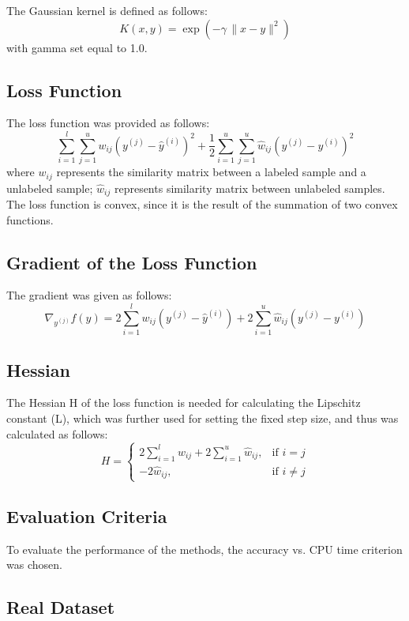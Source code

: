 \documentclass{article}
\begin{document}
\noindent The Gaussian kernel is defined as follows:
\[
K(x, y) = \exp\left( -\gamma \, \|x - y\|^2 \right)
\]
with gamma set equal to 1.0.

\subsection{Loss Function}
The loss function was provided as follows:
\[
\sum_{i=1}^{l} \sum_{j=1}^{u} w_{ij} \left( y^{(j)} - \hat{y}^{(i)} \right)^2
+ \frac{1}{2} \sum_{i=1}^{u} \sum_{j=1}^{u} \widehat{w}_{ij} \left( y^{(j)} - y^{(i)} \right)^2
\]
where \( w_{ij} \) represents the similarity matrix between a labeled sample and a unlabeled sample; \( \widehat{w}_{ij} \) represents similarity matrix between unlabeled samples. \\ 

\noindent The loss function is convex, since it is the result of the summation of two convex functions.
\subsection{Gradient of the Loss Function}
The gradient was given as follows:
\[
\nabla_{y^{(j)}} f(y) = 
2 \sum_{i=1}^{l} w_{ij} \left( y^{(j)} - \hat{y}^{(i)} \right) +
2 \sum_{i=1}^{u} \widehat{w}_{ij} \left( y^{(j)} - y^{(i)} \right)
\]

\subsection{Hessian}
The Hessian H of the loss function is needed for calculating the Lipschitz constant (L), which was further used for setting the fixed step size, and thus was calculated as follows:
\[
H =
\begin{cases}
2 \sum_{i=1}^{l} w_{ij} + 2 \sum_{i=1}^{u} \widehat{w}_{ij}, & \text{if } i = j \\
-2 \widehat{w}_{ij}, & \text{if } i \neq j
\end{cases}
\]

\subsection{Evaluation Criteria}
To evaluate the performance of the methods, the accuracy vs. CPU time criterion was chosen.  

\subsection{Real Dataset}
\end{document}
